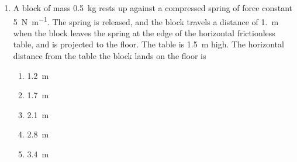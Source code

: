 \documentclass{../../oss-apphys}
\begin{document}
\begin{multicols}{2}
\begin{enumerate}[leftmargin=18pt,resume]
    \columnbreak
    
  \item A block of mass \SI{.5}{\kilo\gram} rests up against a compressed
    spring of force constant \SI{5}{\newton\per\metre}. The spring is released,
    and the block travels a distance of \SI{1.}{\metre} when the block leaves
    the spring at the edge of the horizontal frictionless table, and is
    projected to the floor. The table is \SI{1.5}{\metre} high. The horizontal
    distance from the table the block lands on the floor is
    \begin{center}
    \end{center}
    \begin{enumerate}[noitemsep,topsep=0pt,leftmargin=18pt,label=(\Alph*)]
    \item\SI{1.2}{\metre}
    \item\SI{1.7}{\metre}
    \item\SI{2.1}{\metre}
    \item\SI{2.8}{\metre}
    \item\SI{3.4}{\metre}
    \end{enumerate}
%
%
%
%

\end{enumerate}
\end{multicols}
\end{document}
